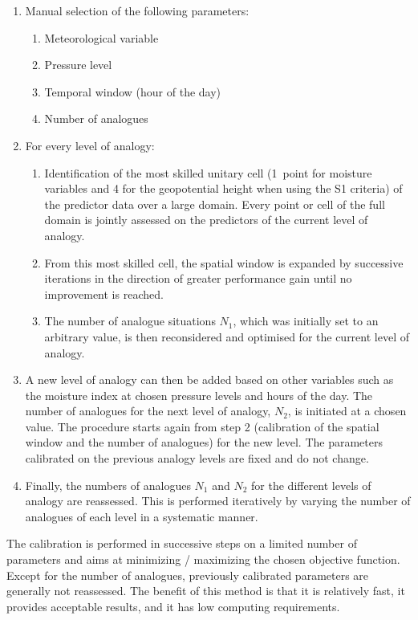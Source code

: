 \documentclass[review]{elsarticle}
\begin{document}
\begin{enumerate}
	\item Manual selection of the following parameters:
	\begin{enumerate}
		\item Meteorological variable
		\item Pressure level
		\item Temporal window (hour of the day)
		\item Number of analogues
	\end{enumerate}
	
	\item For every level of analogy:
	\begin{enumerate}
		\item Identification of the most skilled unitary cell (1~point for moisture variables and 4 for the geopotential height when using the S1 criteria) of the predictor data over a large domain. Every point or cell of the full domain is jointly assessed on the predictors of the current level of analogy.
		\item From this most skilled cell, the spatial window is expanded by successive iterations in the direction of greater performance gain until no improvement is reached.
		\item The number of analogue situations $N_{1}$, which was initially set to an arbitrary value, is then reconsidered and optimised for the current level of analogy.
	\end{enumerate}
	\item A new level of analogy can then be added based on other variables such as the moisture index at chosen pressure levels and hours of the day. The number of analogues for the next level of analogy, $N_{2}$, is initiated at a chosen value. The procedure starts again from step 2 (calibration of the spatial window and the number of analogues) for the new level. The parameters calibrated on the previous analogy levels are fixed and do not change. 
	\item Finally, the numbers of analogues $N_{1}$ and $N_{2}$ for the different levels of analogy are reassessed. This is performed iteratively by varying the number of analogues of each level in a systematic manner.
\end{enumerate}

The calibration is performed in successive steps on a limited number of parameters and aims at minimizing / maximizing the chosen objective function. Except for the number of analogues, previously calibrated parameters are generally not reassessed. The benefit of this method is that it is relatively fast, it provides acceptable results, and it has low computing requirements. 
\end{document}
